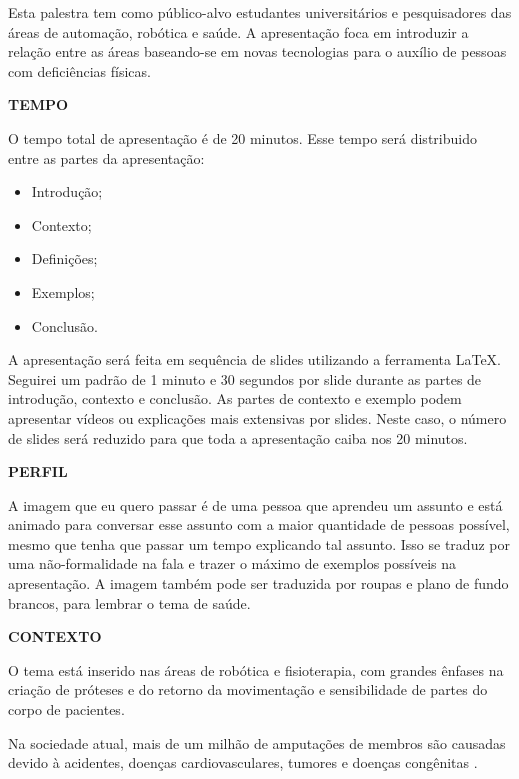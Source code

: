 \documentclass[12pt,a4paper]{article}
\begin{document}
    \par Esta palestra tem como público-alvo estudantes universitários e pesquisadores das áreas de automação, robótica e saúde. A apresentação foca em introduzir a relação entre as áreas baseando-se em novas tecnologias para o auxílio de pessoas com deficiências físicas.
    \newline
    \newline
    \par \textbf{TEMPO}
    \par O tempo total de apresentação é de 20 minutos. Esse tempo será distribuido entre as partes da apresentação:
    \begin{itemize}
    \item Introdução;
    \item Contexto;
    \item Definições;
    \item Exemplos;
    \item Conclusão.
    \end{itemize}
    \par A apresentação será feita em sequência de slides utilizando a ferramenta LaTeX. Seguirei um padrão de 1 minuto e 30 segundos por slide durante as partes de introdução, contexto e conclusão. As partes de contexto e exemplo podem apresentar vídeos ou explicações mais extensivas por slides. Neste caso, o número de slides será reduzido para que toda a apresentação caiba nos 20 minutos.
    \newline
    \newline
    \par \textbf{PERFIL}
    \par A imagem que eu quero passar é de uma pessoa que aprendeu um assunto e está animado para conversar esse assunto com a maior quantidade de pessoas possível, mesmo que tenha que passar um tempo explicando tal assunto. Isso se traduz por uma não-formalidade na fala e trazer o máximo de exemplos possíveis na apresentação. A imagem também pode ser traduzida por roupas e plano de fundo brancos, para lembrar o tema de saúde.
    \newline
    \newline
    \par \textbf{CONTEXTO}
    \par O tema está inserido nas áreas de robótica e fisioterapia, com grandes ênfases na criação de próteses e do retorno da movimentação e sensibilidade de partes do corpo de pacientes.
    \par Na sociedade atual, mais de um milhão de amputações de membros são causadas devido à acidentes, doenças cardiovasculares, tumores e doenças congênitas \cite{5}.
\end{document}

